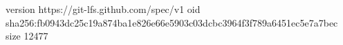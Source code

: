 version https://git-lfs.github.com/spec/v1
oid sha256:fb0943dc25c19a874ba1e826e66e5903c03dcbc3964f3f789a6451ec5e7a7bec
size 12477

